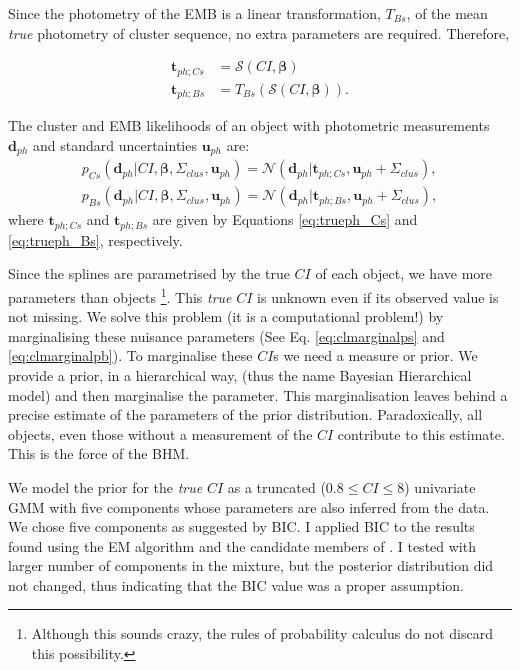 Since the photometry of the EMB is a linear transformation, $T_{Bs}$, of the mean \emph{true} photometry of cluster sequence, no extra parameters are required. Therefore, 

\begin{align}
\boldsymbol{t}_{ph;Cs} &= \boldsymbol{\mathcal{S}}(CI, \boldsymbol{\beta}) \label{eq:trueph_Cs}\\
\boldsymbol{t}_{ph;Bs} &=T_{Bs}( \boldsymbol{\mathcal{S}}(CI, \boldsymbol{\beta})).
\label{eq:trueph_Bs}
\end{align}

The cluster and EMB likelihoods of an object with photometric measurements $\mathbf{d}_{ph}$ and standard uncertainties $\mathbf{u}_{ph}$ are:
\begin{align}
\label{eq:lik-seq}
 p_{Cs}(\mathbf{d}_{ph}| CI, \boldsymbol{\beta},\Sigma_{clus},\mathbf{u}_{ph})={\mathcal{N}}(\mathbf{d}_{ph}|\boldsymbol{t}_{ph;Cs}, \mathbf{u}_{ph}+\Sigma_{clus}),\nonumber \\
p_{Bs}(\mathbf{d}_{ph}| CI, \boldsymbol{\beta},\Sigma_{clus}, \mathbf{u}_{ph})={\mathcal{N}}(\mathbf{d}_{ph}|\boldsymbol{t}_{ph;Bs}, \mathbf{u}_{ph}+\Sigma_{clus}),
\end{align}
where $\boldsymbol{t}_{ph;Cs}$ and $\boldsymbol{t}_{ph;Bs}$ are given by Equations \ref{eq:trueph_Cs} and \ref{eq:trueph_Bs}, respectively.

Since the splines are parametrised by the true $CI$ of each object, we have more parameters than objects \footnote{Although this sounds crazy, the rules of probability calculus do not discard this possibility.}. This \emph{true} $CI$ is unknown even if its observed value is not missing. We solve this problem (it is a computational problem!) by marginalising these nuisance parameters (See Eq. \ref{eq:clmarginalps} and \ref{eq:clmarginalpb}). To marginalise these $CI$s we need a measure or prior. We provide a prior, in a hierarchical way, (thus the name Bayesian Hierarchical model) and then marginalise the parameter. This marginalisation leaves behind a precise estimate of the parameters of the prior distribution. Paradoxically, all objects, even those without a measurement of the $CI$ contribute to this estimate. This is the force of the BHM.

We model the prior for the \emph{true} $CI$  as a truncated ($0.8\leq CI \leq8$) univariate GMM with five components whose parameters are also inferred from the data. We chose five components as suggested by BIC. I applied BIC to the results found using the EM algorithm and the candidate members of \citet{Bouy2015}. I tested with larger number of components in the mixture, but the posterior distribution did not changed, thus indicating that the BIC value was a proper assumption.

